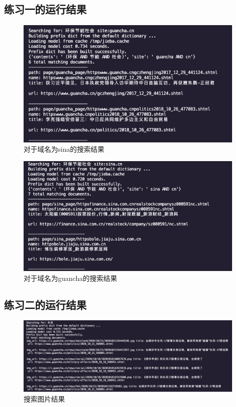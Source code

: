 \documentclass[UTF8]{ctexart}
\begin{document}
        \subsection{练习一的运行结果}
        \begin{figure}[ht]
            \centering
            \includegraphics[scale=0.3]{img/search_sina.png}
            \caption{对于域名为sina的搜索结果}
        \end{figure} 
        \begin{figure}[ht]
            \centering
            \includegraphics[scale=0.3]{img/search_guancha.png}
            \caption{对于域名为guancha的搜索结果}
        \end{figure} 
        \subsection{练习二的运行结果}
        \begin{figure}[ht]
            \centering
            \includegraphics[scale=0.3]{img/search_ph.png}
            \caption{搜索图片结果}
        \end{figure} 
\end{document}

